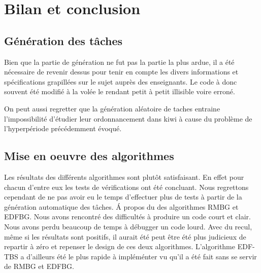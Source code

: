 \chapter{Bilan et conclusion}
\section{Génération des tâches}
Bien que la partie de génération ne fut pas la partie la plus ardue, il a été nécessaire de revenir dessus pour tenir en compte les divers informations et spécifications grapillées sur le sujet auprès des enseignants. Le code à donc souvent été modifié à la volée le rendant petit à petit illisible voire erroné.

On peut aussi regretter que la génération aléatoire de taches entraine l'impossibilité d'étudier leur ordonnancement dans kiwi à cause du problème de l'hyperpériode précédemment évoqué.


\section{Mise en oeuvre des algorithmes}

Les résultats des différents algorithmes sont plutôt satisfaisant. En effet pour chacun d'entre eux les tests de vérifications ont été concluant. Nous regrettons cependant de ne pas avoir eu le temps d'effectuer plus de tests à partir de la génération automatique des tâches.
\'A propos du des algorithmes RMBG et EDFBG. Nous avons rencontré des difficultés à produire un code court et clair. Nous avons perdu beaucoup de temps à débugger un code lourd. Avec du recul, même si les résultats sont positifs, il aurait été peut être été plus judicieux de repartir à zéro et repenser le design de ces deux algorithmes.  L'algorithme EDF-TBS a d'ailleurs été le plus rapide à impléménter vu qu'il a été fait sans se servir de RMBG et EDFBG.

